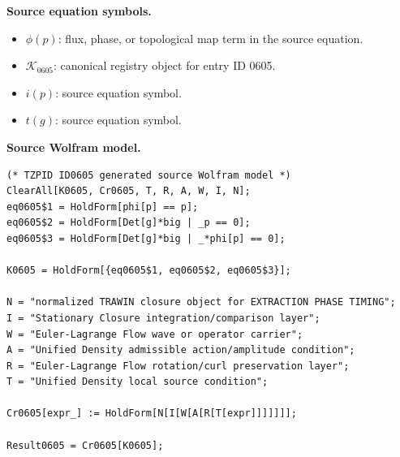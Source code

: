 \begin{minipage}[t]{0.49\linewidth}
\begingroup
\small
\raggedright
\textbf{Source equation symbols.}\par
\begin{itemize}[leftmargin=1.35em,itemsep=1pt,topsep=1pt,parsep=0pt]
    \item $\phi(p)$: flux, phase, or topological map term in the source equation.
    \item $\mathcal{K}_{0605}$: canonical registry object for entry ID 0605.
    \item $i(p)$: source equation symbol.
    \item $t(g)$: source equation symbol.
\end{itemize}
\endgroup
\end{minipage}\hfill
\begin{minipage}[t]{0.47\linewidth}
\begingroup
\scriptsize
\raggedright
\textbf{Source Wolfram model.}\par
\begin{Verbatim}[fontsize=\tiny,breaklines=true,breakanywhere=true]
(* TZPID ID0605 generated source Wolfram model *)
ClearAll[K0605, Cr0605, T, R, A, W, I, N];
eq0605$1 = HoldForm[phi[p] == p];
eq0605$2 = HoldForm[Det[g]*big | _p == 0];
eq0605$3 = HoldForm[Det[g]*big | _*phi[p] == 0];

K0605 = HoldForm[{eq0605$1, eq0605$2, eq0605$3}];

N = "normalized TRAWIN closure object for EXTRACTION PHASE TIMING";
I = "Stationary Closure integration/comparison layer";
W = "Euler-Lagrange Flow wave or operator carrier";
A = "Unified Density admissible action/amplitude condition";
R = "Euler-Lagrange Flow rotation/curl preservation layer";
T = "Unified Density local source condition";

Cr0605[expr_] := HoldForm[N[I[W[A[R[T[expr]]]]]]];

Result0605 = Cr0605[K0605];
\end{Verbatim}
\endgroup
\end{minipage}

